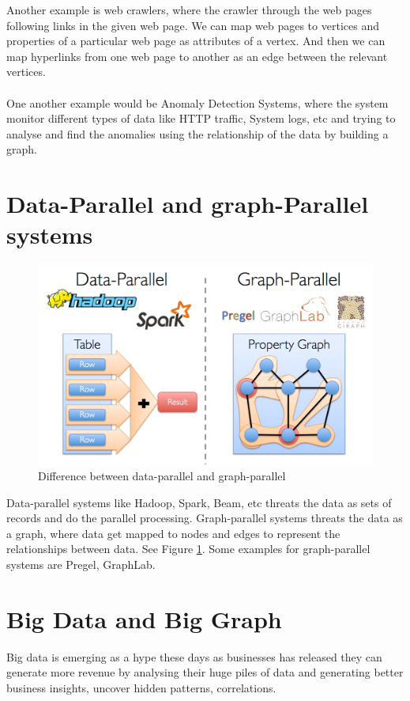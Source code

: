 \documentclass[12pt]{report}
\numberwithin{figure}{section}
\numberwithin{table}{section}
\begin{document}
Another example is web crawlers, where the crawler through the web pages following links in the given web page. We can map web pages to vertices and properties of a particular web page as attributes of a vertex. And then we can map hyperlinks from one web page to another as an edge between the relevant vertices.  

\paragraph{}

One another example would be Anomaly  Detection Systems, where the system monitor different types of data like HTTP traffic, System logs, etc and trying to analyse and find the anomalies using the relationship of the data by building a graph.

\section{Data-Parallel and graph-Parallel systems}

\begin{figure}[H]
\centering
\includegraphics[scale=0.3]{images/image00}
\caption{Difference between data-parallel and graph-parallel}
\label{fig:parallel}
\end{figure}

Data-parallel systems like Hadoop, Spark, Beam, etc threats the data as sets of records and do the parallel processing. Graph-parallel systems threats the data as a graph, where data get mapped to nodes and edges to represent the relationships between data. See Figure \ref{fig:parallel}. Some examples for graph-parallel systems are Pregel, GraphLab.

\section{Big Data and Big Graph}
Big data is emerging as a hype these days as businesses has released they can generate more revenue by analysing their huge piles of data and generating better business insights,  uncover hidden patterns, correlations. 
\end{document}
